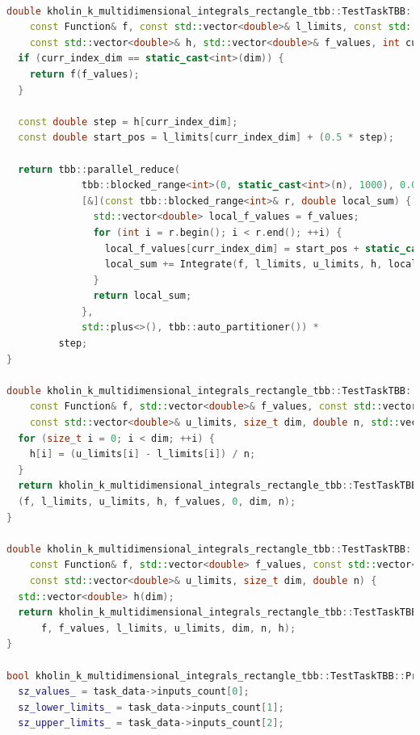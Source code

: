 \documentclass[14pt,a4paper]{article}
\begin{document}
\begin{framed}
\begin{lstlisting}[language=C++]

double kholin_k_multidimensional_integrals_rectangle_tbb::TestTaskTBB::Integrate(
    const Function& f, const std::vector<double>& l_limits, const std::vector<double>& u_limits,
    const std::vector<double>& h, std::vector<double>& f_values, int curr_index_dim, size_t dim, double n) {
  if (curr_index_dim == static_cast<int>(dim)) {
    return f(f_values);
  }

  const double step = h[curr_index_dim];
  const double start_pos = l_limits[curr_index_dim] + (0.5 * step);

  return tbb::parallel_reduce(
             tbb::blocked_range<int>(0, static_cast<int>(n), 1000), 0.0,
             [&](const tbb::blocked_range<int>& r, double local_sum) {
               std::vector<double> local_f_values = f_values;
               for (int i = r.begin(); i < r.end(); ++i) {
                 local_f_values[curr_index_dim] = start_pos + static_cast<double>(i) * step;
                 local_sum += Integrate(f, l_limits, u_limits, h, local_f_values, curr_index_dim + 1, dim, n);
               }
               return local_sum;
             },
             std::plus<>(), tbb::auto_partitioner()) *
         step;
}

double kholin_k_multidimensional_integrals_rectangle_tbb::TestTaskTBB::IntegrateWithRectangleMethod(
    const Function& f, std::vector<double>& f_values, const std::vector<double>& l_limits,
    const std::vector<double>& u_limits, size_t dim, double n, std::vector<double>& h) {
  for (size_t i = 0; i < dim; ++i) {
    h[i] = (u_limits[i] - l_limits[i]) / n;
  }
  return kholin_k_multidimensional_integrals_rectangle_tbb::TestTaskTBB::Integrate
  (f, l_limits, u_limits, h, f_values, 0, dim, n);
}

double kholin_k_multidimensional_integrals_rectangle_tbb::TestTaskTBB::RunMultistepSchemeMethodRectangle(
    const Function& f, std::vector<double> f_values, const std::vector<double>& l_limits,
    const std::vector<double>& u_limits, size_t dim, double n) {
  std::vector<double> h(dim);
  return kholin_k_multidimensional_integrals_rectangle_tbb::TestTaskTBB::IntegrateWithRectangleMethod(
      f, f_values, l_limits, u_limits, dim, n, h);
}

bool kholin_k_multidimensional_integrals_rectangle_tbb::TestTaskTBB::PreProcessingImpl() {
  sz_values_ = task_data->inputs_count[0];
  sz_lower_limits_ = task_data->inputs_count[1];
  sz_upper_limits_ = task_data->inputs_count[2];


\end{lstlisting}
\end{framed}
\end{document}
